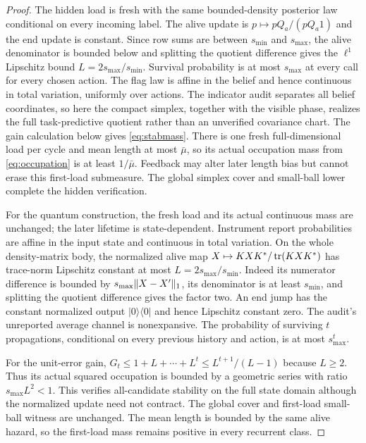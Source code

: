 \begin{proof}
The hidden load is fresh with the same bounded-density posterior law conditional on every incoming label. The alive update is $p\mapsto pQ_a/(pQ_a1)$ and the end update is constant. Since row sums are between $s_{\min}$ and $s_{\max}$, the alive denominator is bounded below and splitting the quotient difference gives the $\ell^1$ Lipschitz bound $L=2s_{\max}/s_{\min}$. Survival probability is at most $s_{\max}$ at every call for every chosen action. The flag law is affine in the belief and hence continuous in total variation, uniformly over actions. The indicator audit separates all belief coordinates, so here the compact simplex, together with the visible phase, realizes the full task-predictive quotient rather than an unverified covariance chart. The gain calculation below gives \eqref{eq:stabmass}. There is one fresh full-dimensional load per cycle and mean length at most $\bar\mu$, so its actual occupation mass from \eqref{eq:occupation} is at least $1/\bar\mu$. Feedback may alter later length bias but cannot erase this first-load submeasure. The global simplex cover and small-ball lower complete the hidden verification.

For the quantum construction, the fresh load and its actual continuous mass are unchanged; the later lifetime is state-dependent. Instrument report probabilities are affine in the input state and continuous in total variation. On the whole density-matrix body, the normalized alive map $X\mapsto KXK^*/\operatorname{tr}(KXK^*)$ has trace-norm Lipschitz constant at most $L=2s_{\max}/s_{\min}$. Indeed its numerator difference is bounded by $s_{\max}\lVert X-X'\rVert_1$, its denominator is at least $s_{\min}$, and splitting the quotient difference gives the factor two. An end jump has the constant normalized output $|0\rangle\langle0|$ and hence Lipschitz constant zero. The audit's unreported average channel is nonexpansive. The probability of surviving $t$ propagations, conditional on every previous history and action, is at most $s_{\max}^t$.

For the unit-error gain, $G_t\le1+L+\cdots+L^t\le L^{t+1}/(L-1)$ because $L\ge2$. Thus its actual squared occupation is bounded by a geometric series with ratio $s_{\max}L^2<1$. This verifies all-candidate stability on the full state domain although the normalized update need not contract. The global cover and first-load small-ball witness are unchanged. The mean length is bounded by the same alive hazard, so the first-load mass remains positive in every recurrent class.


\end{proof}
